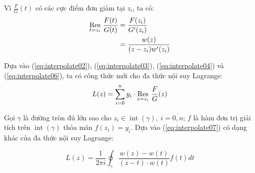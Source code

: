 	Vì \(\frac{F}{G}(t) \) có các cực điểm đơn giảm tại \(z_i\), ta có:
	\begin{align}
		\Res{\frac{F(t)}{G(t)}}{t=z_i} &= \frac{F(z_i)}{G'(z_i)}\nonumber\\
		\label{eq:interpolate06}
		&= \frac{w(z)}{(z-z_i)w'(z_i)}
	\end{align}

	Dựa vào (\ref{eq:interpolate02}),  (\ref{eq:interpolate03}), (\ref{eq:interpolate04}) và (\ref{eq:interpolate06}), ta có công thức mới cho đa thức nội suy Lagrange:
	\begin{equation}
		\label{eq:interpolate07}
		L(z) = \sum_{i=0}^n y_i\cdot \Res{\frac{F}{G}(z)}{z=z_i}
	\end{equation}

	Gọi \(\gamma\) là đường tròn đủ lớn sao cho \(z_i \in \operatorname{int}( \gamma ),\ i=\overline{0,n}\); \(f\) là hàm đơn trị giải tích trên \(\operatorname{int}(\gamma)\) thỏa mãn \(f(z_i) = y_i\). Dựa vào (\ref{eq:interpolate07}) có dạng khác của đa thức nội suy Lagrange:

	\begin{equation}
		L(z) = \frac{1}{2\pi i} \oint_\gamma \frac{w(z) - w(t)}{(z-t)\cdot w(t)}f(t)dt
	\end{equation}